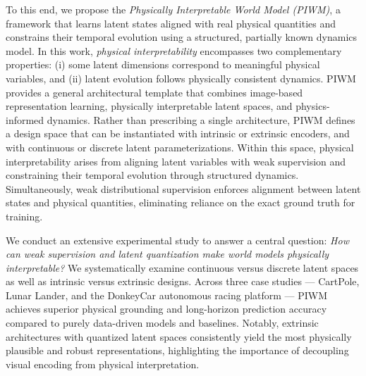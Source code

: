 \documentclass[nonacm,sigconf]{acmart}
\begin{document}
To this end, we propose the \textit{Physically Interpretable World Model (PIWM)}, a framework that learns latent states aligned with real physical quantities and constrains their temporal evolution using a structured, partially known dynamics model. In this work, \emph{physical interpretability} encompasses two complementary properties: (i) some latent dimensions correspond to meaningful physical variables, and (ii) latent evolution follows physically consistent dynamics. PIWM provides a general architectural template that combines image-based representation learning, physically interpretable latent spaces, and physics-informed dynamics.
Rather than prescribing a single architecture, PIWM defines a design space that can be instantiated with intrinsic or extrinsic encoders, and with continuous or discrete latent parameterizations.
Within this space, physical interpretability arises from aligning latent variables with weak supervision and constraining their temporal evolution through structured dynamics. Simultaneously, weak distributional supervision enforces alignment between latent states and physical quantities, eliminating reliance on the exact ground truth for training.

We conduct an extensive experimental study to answer a central question: \emph{How can weak supervision and latent quantization make world models physically interpretable?} We systematically examine continuous versus discrete latent spaces as well as intrinsic versus extrinsic designs. Across three case studies --- CartPole, Lunar Lander, and the DonkeyCar autonomous racing platform --- PIWM achieves superior physical grounding and long-horizon prediction accuracy compared to purely data-driven models and baselines. Notably, extrinsic architectures with quantized latent spaces consistently yield the most physically plausible and robust representations, highlighting the importance of decoupling visual encoding from physical interpretation.
\end{document}
